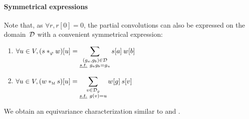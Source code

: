\paragraph{Symmetrical expressions}
Note that, as $\forall r, r[0] = 0$, the partial convolutions can also be expressed on the domain~$\cd$ with a convenient symmetrical expression:
\begin{enumerate}[label=(\roman*)]
  \item $\forall u \in V, (s \ast_\varphi w)[u] =  \displaystyle\sum_{\substack{(g_a,g_b) \in \cd\\ \st g_ag_b = g_u}} s[a] \h{2} w[b]$
  \item $\forall u \in V, (w \ast_{\M} s)[u]  = \displaystyle\sum_{\substack{v \in \cd_g\\ \st g(v) = u}} w[g] \h{2} s[v]$
\end{enumerate}

We obtain an equivariance characterization similar to  and .

